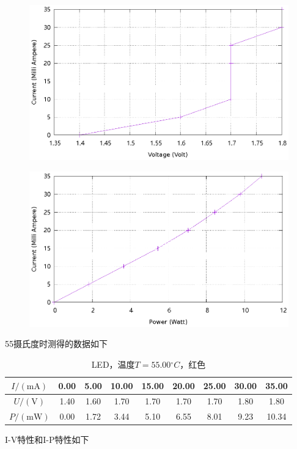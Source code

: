 \documentclass{ctexart}
\newcommand{\si}[1]{\mathrm{#1}}
\begin{document}
\begin{figure}[H]
  \centering
  \includegraphics[width=0.8\linewidth]{optics-figures/led-vc-6.gnuplot}
\end{figure}
  
\begin{figure}[H]
  \centering
  \includegraphics[width=0.8\linewidth]{optics-figures/led-pc-6.gnuplot}
\end{figure}

\newpage
55摄氏度时测得的数据如下

\begin{table}[H]
  \centering
  \begin{tabular}{|c|c|c|c|c|c|c|c|c|}
    \hline
    $I/(\si{mA})$   & 0.00 & 5.00 & 10.00 & 15.00 & 20.00 & 25.00 & 30.00 & 35.00 \\\hline
    $U / (\si{V})$  & 1.40 & 1.60 & 1.70 & 1.70 & 1.70 & 1.70 & 1.80 & 1.80 \\\hline
    $P / (\si{mW})$ & 0.00 & 1.72 & 3.44 & 5.10 & 6.55 & 8.01 & 9.23 & 10.34 \\\hline
  \end{tabular}
  \caption{LED，温度$T=55.00{}^{\circ}C$，红色}
\end{table}

I-V特性和I-P特性如下
\end{document}
